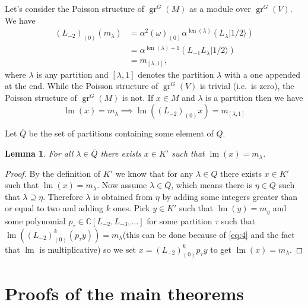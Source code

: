 \documentclass[12pt, a4paper]{article}
\newtheorem{lemma}{Lemma}
\DeclareMathOperator{\gr}{gr}
\DeclareMathOperator{\lm}{lm}
\DeclareMathOperator{\len}{len}
\newcommand{\vachalf}{|1/2\rangle}
\begin{document}
Let's consider the Poisson structure of $\gr^G(M)$ as a module over $\gr^G(V)$.
We have
\begin{align*}
  (L_{-2})_{(0)}(m_\lambda) &= \alpha^2(\omega)_{(0)}\alpha^{\len(\lambda)}(L_\lambda\vachalf) \\
  &= \alpha^{\len(\lambda) + 1}(L_{-1}L_\lambda\vachalf) \\
  &= m_{[\lambda, 1]},
\end{align*}
where $\lambda$ is any partition and $[\lambda, 1]$ denotes the partition $\lambda$ with a one appended at the end.
While the Poisson structure of $\gr^G(V)$ is trivial (i.e.\ is zero), the Poisson structure of $\gr^G(M)$ is not.
If $x \in M$ and $\lambda$ is a partition then we have
\begin{equation}
  \label{eq:4}
  \lm(x) = m_\lambda \implies \lm((L_{-2})_{(0)}x) = m_{[\lambda,1]}
\end{equation}

Let $\overline{Q}$ be the set of partitions containing some element of $Q$.
\begin{lemma}
  \label{lmm:11}
  For all $\lambda \in \overline{Q}$ there exists $x \in K'$ such that $\lm(x) = m_\lambda$.
\end{lemma}

\begin{proof}
  By the definition of $K'$ we know that for any $\lambda \in Q$ there exists $x \in K'$ such that $\lm(x) = m_\lambda$.
  Now assume $\lambda \in \overline{Q}$, which means there is $\eta \in Q$ such that $\lambda \supseteq \eta$.
  Therefore $\lambda$ is obtained from $\eta$ by adding some integers greater than or equal to two and adding $k$ ones.
  Pick $y \in K'$ such that $\lm(y) = m_\eta$ and some polynomial $p_\tau \in \mathbb{C}[L_{-2}, L_{-3}, \dots]$ for some partition $\tau$ such that $\lm((L_{-2})^k_{(0)}(p_\tau y)) = m_\lambda$(this can be done because of \eqref{eq:4} and the fact that $\lm$ is multiplicative) so we set $x = (L_{-2})^k_{(0)}p_\tau y$ to get $\lm(x) = m_\lambda$.
\end{proof}

\section{Proofs of the main theorems}
\label{sec:proofs-main-theorems}
\end{document}
